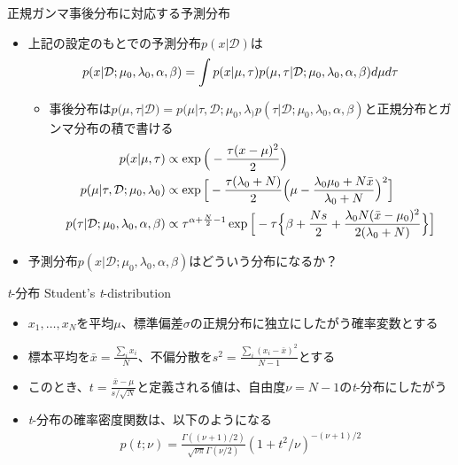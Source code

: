 \documentclass[aspectratio=169,unicode,dvipdfmx,14pt]{beamer}
\begin{document}
\begin{frame}{正規ガンマ事後分布に対応する予測分布}
\begin{itemize}
\item 上記の設定のもとでの予測分布$p(x | \mathcal{D})$は
\vspace{-.1in}
\begin{align}
p(x|\mathcal{D};\mu_0,\lambda_0,\alpha,\beta) = \int p(x|\mu,\tau)
p(\mu,\tau|\mathcal{D};\mu_0,\lambda_0,\alpha,\beta) d\mu d\tau
\notag
\end{align}
\vspace{-.2in}
\begin{itemize}
\item 事後分布は$p(\mu,\tau|\mathcal{D})=p(\mu|\tau,\mathcal{D};\mu_0,\lambda_)p(\tau|\mathcal{D};\mu_0,\lambda_0,\alpha,\beta)$と正規分布とガンマ分布の積で書ける
\begin{align}
p(x|\mu,\tau) & \propto \exp \Big( - \frac{\tau(x - \mu)^2}{2}  \Big) \notag \\
p(\mu|\tau,\mathcal{D};\mu_0,\lambda_0) & \propto \exp \Big[ - \frac{\tau( \lambda_0 + N )}{2}  \Big( \mu - \frac{ \lambda_0 \mu_0 + N\bar{x} }{ \lambda_0 + N } \Big)^2 \Big] \notag \\
p(\tau|\mathcal{D};\mu_0,\lambda_0,\alpha,\beta) & \propto \tau^{\alpha + \frac{N}{2} - 1}
\exp \Big[ - \tau \Big\{ \beta + \frac{Ns}{2} + \frac{ \lambda_0 N (\bar{x} - \mu_0)^2 }{ 2( \lambda_0 + N ) } \Big\} \Big]
\notag
\end{align}
\end{itemize}
\item 予測分布$p(x|\mathcal{D};\mu_0,\lambda_0,\alpha,\beta)$はどういう分布になるか？
\end{itemize}
\end{frame}

\begin{frame}{\textit{t}-分布 Student's \textit{t}-distribution}
\begin{itemize}
\item $x_1,\ldots,x_N$を平均$\mu$、標準偏差$\sigma$の正規分布に独立にしたがう確率変数とする
\item 標本平均を$\bar{x}=\frac{\sum_i x_i}{N}$、不偏分散を$s^2=\frac{\sum_i (x_i - \bar{x})^2}{N-1}$とする
\item このとき、$t = \frac{\bar{x} - \mu}{s / \sqrt{N}}$と定義される値は、自由度$\nu=N-1$の\textit{t}-分布にしたがう
\item \textit{t}-分布の確率密度関数は、以下のようになる
\begin{align}
p(t;\nu) = \frac{\Gamma((\nu+1)/2)}{\sqrt{\nu\pi}\Gamma(\nu/2)}(1 + t^2/\nu)^{-(\nu+1)/2}
\end{align}
\end{itemize}
\end{frame}
\end{document}
